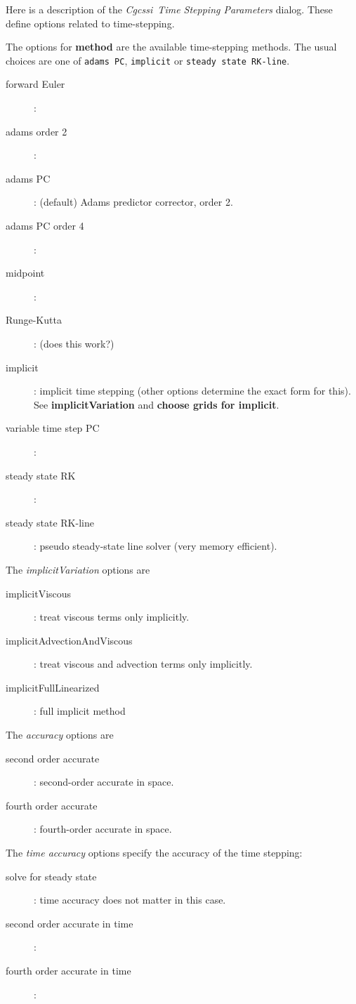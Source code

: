 \documentclass{article}
\newcommand{\Solver}{Cgcssi}
\begin{document}
Here is a description of the {\em \Solver\ Time Stepping Parameters} dialog. These define options
related to time-stepping.

\noindent The options for {\bf method} are the available time-stepping methods. 
The usual choices are one of {\tt adams PC}, {\tt implicit} or {\tt steady state RK-line}. 
\begin{description}
  \item[\qquad forward Euler] :
  \item[\qquad adams order 2] :
  \item[\qquad adams PC] : (default) Adams predictor corrector, order 2.
  \item[\qquad adams PC order 4] :
  \item[\qquad midpoint] :
  \item[\qquad Runge-Kutta] : (does this work?)
  \item[\qquad implicit] : implicit time stepping (other options determine the exact form for this). 
             See {\bf implicitVariation} and {\bf choose grids for implicit}. 
  \item[\qquad variable time step PC] :
  \item[\qquad steady state RK] :
  \item[\qquad steady state RK-line] : pseudo steady-state line solver (very memory efficient). 
\end{description}


\noindent The {\em implicitVariation} options are
\begin{description}
  \item[\qquad implicitViscous] : treat viscous terms only implicitly. 
  \item[\qquad implicitAdvectionAndViscous] : treat viscous and advection terms only implicitly. 
  \item[\qquad implicitFullLinearized] : full implicit method
\end{description}
      

\noindent The {\em accuracy} options are
\begin{description}
  \item[\qquad second order accurate] : second-order accurate in space.
  \item[\qquad fourth order accurate] : fourth-order accurate in space.
\end{description}


\noindent The {\em time accuracy} options specify the accuracy of the time stepping:
\begin{description}
  \item[\qquad solve for steady state] : time accuracy does not matter in this case. 
  \item[\qquad second order accurate in time ] : 
  \item[\qquad fourth order accurate in time ] : 
\end{description}
\end{document}
